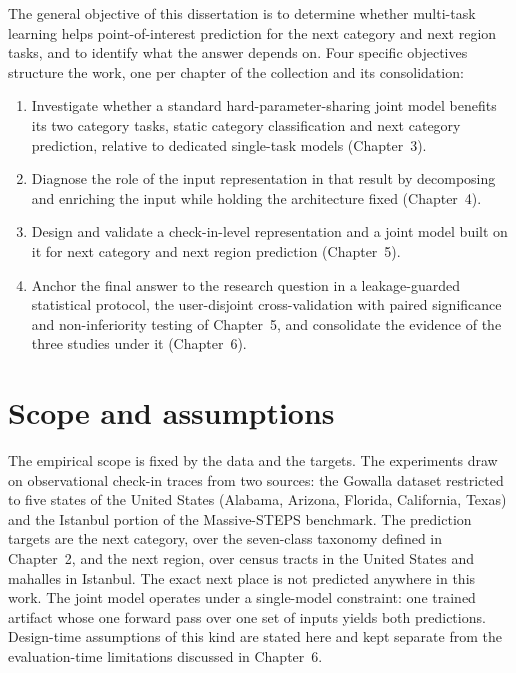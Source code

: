 The general objective of this dissertation is to determine whether multi-task learning
helps point-of-interest prediction for the next category and next region tasks, and to
identify what the answer depends on. Four specific objectives structure the work, one
per chapter of the collection and its consolidation:

\begin{enumerate}
  \item Investigate whether a standard hard-parameter-sharing joint model benefits its
        two category tasks, static category classification and next category
        prediction, relative to dedicated single-task models (Chapter~3).
  \item Diagnose the role of the input representation in that result by decomposing
        and enriching the input while holding the architecture fixed (Chapter~4).
  \item Design and validate a check-in-level representation and a joint model built on
        it for next category and next region prediction (Chapter~5).
  \item Anchor the final answer to the research question in a leakage-guarded
        statistical protocol, the user-disjoint cross-validation with paired
        significance and non-inferiority testing of Chapter~5, and consolidate the
        evidence of the three studies under it (Chapter~6).
\end{enumerate}

\section{Scope and assumptions}
\label{sec:intro:scope}

The empirical scope is fixed by the data and the targets. The experiments draw on
observational check-in traces from two sources: the Gowalla dataset restricted to five
states of the United States (Alabama, Arizona, Florida, California, Texas) and the
Istanbul portion of the Massive-STEPS benchmark. The prediction targets are the next category, over the
seven-class taxonomy defined in Chapter~2, and the next region, over census tracts in
the United States and mahalles in Istanbul. The exact next place is not predicted
anywhere in this work. The joint model operates under a single-model constraint: one
trained artifact whose one forward pass over one set of inputs yields both
predictions. Design-time assumptions of this kind are stated here and kept separate
from the evaluation-time limitations discussed in Chapter~6.

